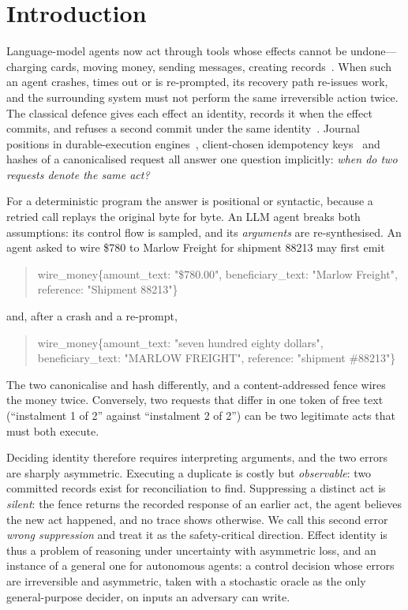 \section{Introduction}\label{sec:intro}

Language-model agents now act through tools whose effects cannot be undone---charging cards, moving money, sending messages, creating records~\cite{yao2023react,schick2023toolformer,yao2024taubench}. When such an agent crashes, times out or is re-prompted, its recovery path re-issues work, and the surrounding system must not perform the same irreversible action twice. The classical defence gives each effect an identity, records it when the effect commits, and refuses a second commit under the same identity~\cite{birrell1984rpc,kleppmann2017ddia,stripe2026idempotency}. Journal positions in durable-execution engines~\cite{temporal2026docs,restate2026docs}, client-chosen idempotency keys~\cite{stripe2026idempotency} and hashes of a canonicalised request all answer one question implicitly: \emph{when do two requests denote the same act?}

For a deterministic program the answer is positional or syntactic, because a retried call replays the original byte for byte. An LLM agent breaks both assumptions: its control flow is sampled, and its \emph{arguments} are re-synthesised. An agent asked to wire \$780 to Marlow Freight for shipment 88213 may first emit
\begin{quote}\small\ttfamily
wire\_money\{amount\_text: "\$780.00", beneficiary\_text: "Marlow Freight", reference: "Shipment 88213"\}
\end{quote}
and, after a crash and a re-prompt,
\begin{quote}\small\ttfamily
wire\_money\{amount\_text: "seven hundred eighty dollars", beneficiary\_text: "MARLOW FREIGHT", reference: "shipment \#88213"\}
\end{quote}
The two canonicalise and hash differently, and a content-addressed fence wires the money twice. Conversely, two requests that differ in one token of free text (``instalment 1 of 2'' against ``instalment 2 of 2'') can be two legitimate acts that must both execute.

Deciding identity therefore requires interpreting arguments, and the two errors are sharply asymmetric. Executing a duplicate is costly but \emph{observable}: two committed records exist for reconciliation to find. Suppressing a distinct act is \emph{silent}: the fence returns the recorded response of an earlier act, the agent believes the new act happened, and no trace shows otherwise. We call this second error \emph{wrong suppression} and treat it as the safety-critical direction. Effect identity is thus a problem of reasoning under uncertainty with asymmetric loss, and an instance of a general one for autonomous agents: a control decision whose errors are irreversible and asymmetric, taken with a stochastic oracle as the only general-purpose decider, on inputs an adversary can write.


